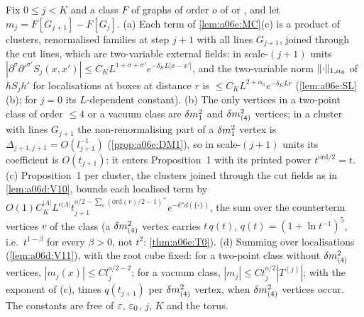 \begin{lemma}\label{lem:a06e:CUT}
Fix $0\le j<K$ and a class $F$ of graphs of order $o$ of \cite[(1.23)]{Ba3} or \cite[(1.24)]{Ba3}, and let $m_j=F[G_{j+1}]-F[G_j]$. \textup{(a)} Each term of \cref{lem:a06e:MC}(c) is a product of clusters, renormalised families at step $j+1$ with all lines $G_{j+1}$, joined through the cut lines, which are two-variable external fields: in scale-$(j+1)$ units $|\partial^\sigma\partial'^{\sigma'}S_j(x,x')|\le C_KL^{1+\sigma+\sigma'}e^{-\delta_KL|x-x'|}$, and the two-variable norm $\lVert \cdot\rVert_{1,\alpha_0}$ of $hS_jh'$ for localisations at boxes at distance $r$ is $\le C_KL^{2+\alpha_0}e^{-\delta_KLr}$ (\cref{lem:a06e:SL}(b); for $j=0$ its $L$-dependent constant). \textup{(b)} The only \cite[(1.7)]{Ba3} vertices in a two-point class of order $\le4$ or a vacuum class are $\delta m^2_1$ and $\delta m^2_{(4)}$ vertices; in a cluster with lines $G_{j+1}$ the non-renormalising part of a $\delta m^2_1$ vertex is $\Delta_{j+1,j+1}=O(l_{j+1}^{-1})$ (\cref{prop:a06e:DM1}), so in scale-$(j+1)$ units its coefficient is $O(t_{j+1})$: it enters Proposition~1 with its printed power $t^{\mathrm{ord}/2}=t$. \textup{(c)} Proposition~1 per cluster, the clusters joined through the cut fields as in \cref{lem:a06d:V10}, bounds each localised term by $O(1)C_K^{|\Lambda|}L^{c|\Lambda|}t_{j+1}^{o/2-\sum_v(\mathrm{ord}(v)/2-1)^+}e^{-\delta''d(\{\square\})}$, the sum over the counterterm vertices $v$ of the class (a $\delta m^2_{(4)}$ vertex carries $t\,q(t)$, $q(t)=(1+\ln t^{-1})^5$, i.e.\ $t^{1-\beta}$ for every $\beta>0$, not $t^2$: \cref{thm:a06e:T0}). \textup{(d)} Summing over localisations (\cref{lem:a06d:V11}), with the root cube fixed: for a two-point class without $\delta m^2_{(4)}$ vertices, $|m_j(x)|\le Cl_j^{o/2-2}$; for a vacuum class, $|m_j|\le Ct_j^{o/2}|T^{(j)}|$; with the exponent of \textup{(c)}, times $q(t_{j+1})$ per $\delta m^2_{(4)}$ vertex, when $\delta m^2_{(4)}$ vertices occur. The constants are free of $\varepsilon$, $\varepsilon_0$, $j$, $K$ and the torus.
\end{lemma}

